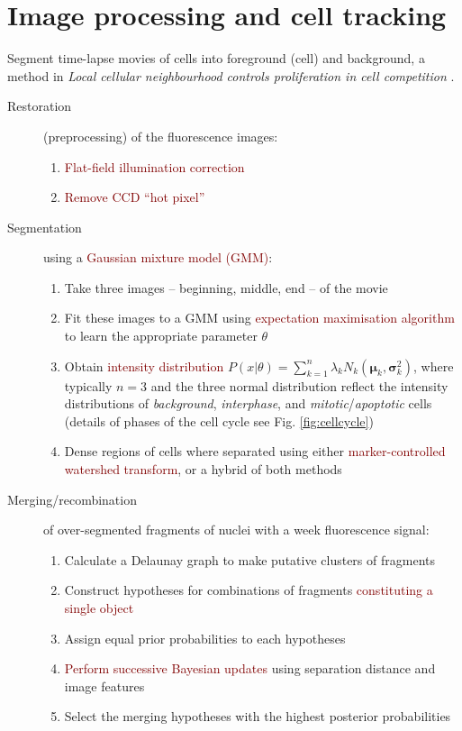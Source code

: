 \section{Image processing and cell tracking} 
Segment time-lapse movies of cells into foreground (cell) and background, a method in \textit{Local cellular neighbourhood controls proliferation in cell competition} \cite{bove2017local}.
\begin{description}
    \item[Restoration] (preprocessing) of the fluorescence images:
    \begin{enumerate}
        \item \textcolor{Maroon}{Flat-field illumination correction}
        \item \textcolor{Maroon}{Remove CCD ``hot pixel''}
    \end{enumerate}
    
    \item[Segmentation] using a \textcolor{Maroon}{Gaussian mixture model (GMM)}:
    \begin{enumerate}
        \item Take three images -- beginning, middle, end -- of the movie
        \item Fit these images to a GMM using \textcolor{Maroon}{expectation maximisation algorithm} \cite{xu1996convergence} to learn the appropriate parameter $\theta$
        \item Obtain \textcolor{Maroon}{intensity distribution} $P(x|\theta) = \sum^n_{k = 1}\lambda_k N_k (\bm{\mu}_k, \bm{\sigma}_k^2)$, where typically $n = 3$ and the three normal distribution reflect the intensity distributions of \textit{background}, \textit{interphase}, and \textit{mitotic}/\textit{apoptotic} cells (details of phases of the cell cycle see Fig. \ref{fig:cellcycle})
        \item Dense regions of cells where separated using either \textcolor{Maroon}{marker-controlled watershed transform}, or a hybrid of both methods
    \end{enumerate}
    
    \item[Merging/recombination] of over-segmented fragments of nuclei with a week fluorescence signal:
    \begin{enumerate}
        \item Calculate a Delaunay graph to make putative clusters of fragments
        \item Construct hypotheses for combinations of fragments \textcolor{Maroon}{constituting a single object}
        \item Assign equal prior probabilities to each hypotheses
        \item \textcolor{Maroon}{Perform successive Bayesian updates} using separation distance and image features
        \item Select the merging hypotheses with the highest posterior probabilities
    \end{enumerate}
    

\end{description}
